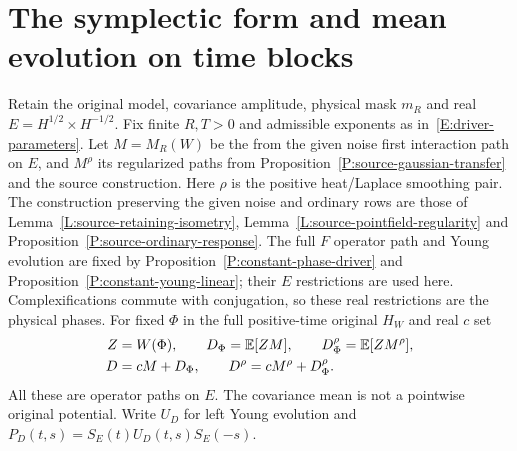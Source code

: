 \section{The symplectic form and mean evolution on time blocks}
\label{S:actual-symplectic-phase}

Retain the original model, covariance amplitude, physical mask $m_R$ and real $E
= H^{1/2}\times H^{-1/2}$. Fix finite $R,T > 0$ and admissible exponents as
in~\eqref{E:driver-parameters}. Let $M = M_R(W)$ be the from the given noise
first interaction path on $E$, and $M^\rho$ its regularized paths from
Proposition~\ref{P:source-gaussian-transfer} and the source construction. Here
$\rho$ is the positive heat/Laplace smoothing pair. The construction preserving
the given noise and ordinary rows are those of
Lemma~\ref{L:source-retaining-isometry},
Lemma~\ref{L:source-pointfield-regularity} and
Proposition~\ref{P:source-ordinary-response}. The full $F$ operator path and
Young evolution are fixed by Proposition~\ref{P:constant-phase-driver} and
Proposition~\ref{P:constant-young-linear}; their $E$ restrictions are used here.
Complexifications commute with conjugation, so these real restrictions are the
physical phases. For fixed $\Phi$ in the full positive-time original $H_W$ and
real $c$ set
\begin{equation}\label{E:symplectic-combined-driver}
  \begin{aligned}
    Z&=W(\Phi),\qquad D_\Phi=\mathbb{E}[ZM],\qquad
    D_\Phi^\rho=\mathbb{E}[ZM^\rho],\\
    D&=cM+D_\Phi,\qquad D^\rho=cM^\rho+D_\Phi^\rho .
  \end{aligned}
\end{equation}
All these are operator paths on $E$. The covariance mean is not a pointwise
original potential. Write $U_D$ for left Young evolution and $P_D(t,s) =
S_E(t)U_D(t,s)S_E(-s)$.

